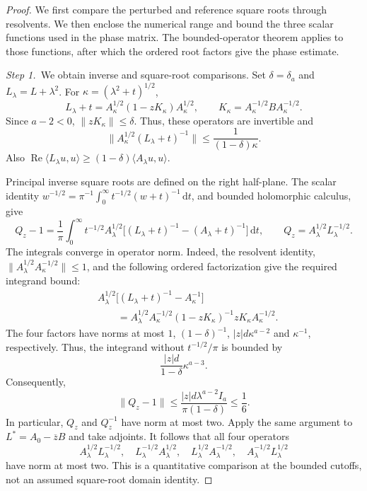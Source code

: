 \documentclass[12pt,oneside,openany]{book}
\numberwithin{equation}{section}
\theoremstyle{nogostyle}
\theoremstyle{definition}
\newcommand{\ud}{\,\mathrm{d}}
\begin{document}
\begin{proof}
  We first compare the perturbed and reference square roots through
  resolvents. We then enclose the numerical range and bound the three scalar
  functions used in the phase matrix. The bounded-operator theorem applies to
  those functions, after which the ordered root factors give the phase
  estimate.


  \medskip
  \noindent\textit{Step 1.~}We obtain inverse and square-root comparisons.
  Set $\delta = \delta_a$ and $L_\lambda = L+\lambda^2$. For $\kappa =
  (\lambda^2+t)^{1/2}$,
  \[
    L_\lambda+t
    =A_\kappa^{1/2}(1-zK_\kappa)A_\kappa^{1/2},\qquad
    K_\kappa=A_\kappa^{-1/2}BA_\kappa^{-1/2}.
  \]
  Since $a-2 < 0$, $\|zK_\kappa\| \le \delta$. Thus, these operators are
  invertible and
  \[
    \|A_\kappa^{1/2}(L_\lambda+t)^{-1}\|
    \le\frac1{(1-\delta)\kappa}.
  \]
  Also $\operatorname{Re}\langle L_\lambda u,u\rangle \ge (1-\delta)\langle
  A_\lambda u,u\rangle$.

  Principal inverse square roots are defined on the right half-plane. The scalar
  identity $w^{-1/2} = \pi^{-1}\int_0^\infty t^{-1/2}(w+t)^{-1}\ud t$, and
  bounded holomorphic calculus, give
  \[
    Q_z-1
    =\frac1\pi\int_0^\infty t^{-1/2}A_\lambda^{1/2}
    \big[(L_\lambda+t)^{-1}-(A_\lambda+t)^{-1}\big]\ud t,
    \qquad Q_z=A_\lambda^{1/2}L_\lambda^{-1/2}.
  \]
  The integrals converge in operator norm. Indeed, the resolvent identity,
  $\|A_\lambda^{1/2}A_\kappa^{-1/2}\| \le 1$, and the following ordered
  factorization give the required integrand bound:
  \[
    \begin{split}
      &A_\lambda^{1/2}
      \big[(L_\lambda+t)^{-1}-A_\kappa^{-1}\big]\\
      &\qquad=A_\lambda^{1/2}A_\kappa^{-1/2}
      (1-zK_\kappa)^{-1}zK_\kappa A_\kappa^{-1/2}.
    \end{split}
  \]
  The four factors have norms at most $1$, $(1-\delta)^{-1}$, $|z|d\kappa^{a-2}$
  and $\kappa^{-1}$, respectively. Thus, the integrand without $t^{-1/2}/\pi$ is
  bounded by
  \[
    \frac{|z|d}{1-\delta}\kappa^{a-3}.
  \]
  Consequently,
  \[
    \|Q_z-1\|
    \le\frac{|z|d\lambda^{a-2}I_a}{\pi(1-\delta)}
    \le\frac16.
  \]
  In particular, $Q_z$ and $Q_z^{-1}$ have norm at most two. Apply the same
  argument to $L^* = A_0-\overline zB$ and take adjoints. It follows that all
  four operators
  \begin{equation}\label{E:phase-root-comparisons}
    A_\lambda^{1/2}L_\lambda^{-1/2},\quad
    L_\lambda^{-1/2}A_\lambda^{1/2},\quad
    L_\lambda^{1/2}A_\lambda^{-1/2},\quad
    A_\lambda^{-1/2}L_\lambda^{1/2}
  \end{equation}
  have norm at most two. This is a quantitative comparison at the bounded
  cutoffs, not an assumed square-root domain identity.



\end{proof}
\end{document}
